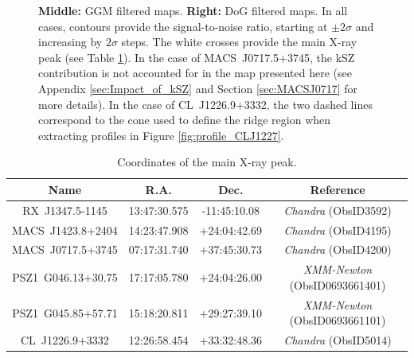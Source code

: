 \documentclass[twocolumn,traditabstract]{aa}
\begin{document}
\begin{figure}[p]
{{{\bf Middle:} GGM filtered maps.
{\bf Right:} DoG filtered maps.
In all cases, contours provide the signal-to-noise ratio, starting at $\pm 2 \sigma$ and increasing by $2 \sigma$ steps. The white crosses provide the main X-ray peak (see Table \ref{tab:xray_peak}). In the case of \mbox{MACS~J0717.5+3745}, the kSZ contribution is not accounted for in the map presented here (see Appendix \ref{sec:Impact_of_kSZ} and Section \ref{sec:MACSJ0717} for more details). In the case of \mbox{CL~J1226.9+3332}, the two dashed lines correspond to the cone used to define the ridge region when extracting profiles in Figure \ref{fig:profile_CLJ1227}.}}
\label{fig:NIKA_cluster_sample}
\end{figure}

\begin{table}[]
\caption{\footnotesize{Coordinates of the main X-ray peak.}}
\begin{center}
\resizebox{0.5\textwidth}{!} {
\begin{tabular}{c|c|c|c}
\hline
\hline
Name & R.A. & Dec. & Reference \\
\hline
RX~J1347.5-1145 & 13:47:30.575 & -11:45:10.08 & \textit{Chandra} (ObsID3592) \\ 
MACS~J1423.8+2404 & 14:23:47.908 & +24:04:42.69 & \textit{Chandra} (ObsID4195) \\ 
MACS~J0717.5+3745 & 07:17:31.740 & +37:45:30.73 & \textit{Chandra} (ObsID4200) \\ 
PSZ1~G046.13+30.75 & 17:17:05.780 & +24:04:26.00 & \textit{XMM-Newton} (ObsID0693661401) \\ 
PSZ1~G045.85+57.71 & 15:18:20.811 & +29:27:39.10 & \textit{XMM-Newton} (ObsID0693661101) \\ 
CL~J1226.9+3332 & 12:26:58.454 & +33:32:48.36 & \textit{Chandra} (ObsID5014) \\ 
\hline
\end{tabular}
}
\end{center}
\label{tab:xray_peak}
\end{table}
\end{document}
